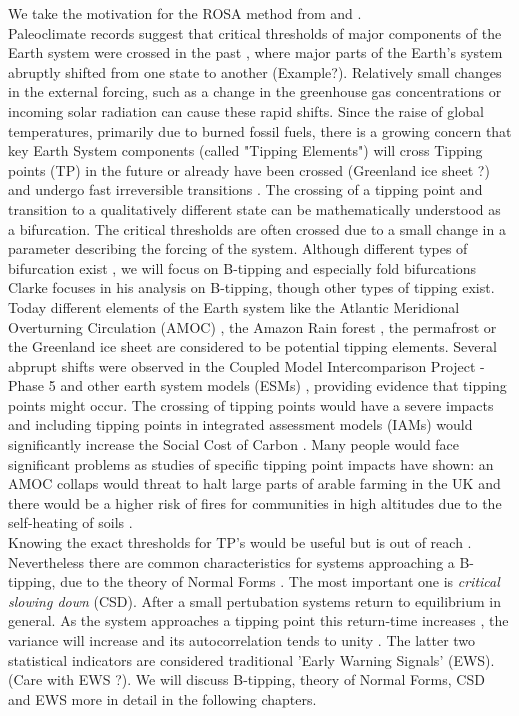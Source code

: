 \documentclass[%
thesis=student,%
coverpage=false,%
titlepage=false,%
headmarks=true, %
german,%
font=libertine, %
math=newpxtx, %
BCOR=5mm,%
coverBCOR=11mm%
]{tumbook}
\begin{document}
We take the motivation for the ROSA method from \cite{Clarke:2023} and \cite{Scheffer:2009}.\\
Paleoclimate records suggest that critical thresholds of major components of the Earth system were crossed in the past \cite{Brovkin:2021}, where major parts of the Earth's system abruptly shifted from one state to another (Example?). Relatively small changes in the external forcing, such as a change in the greenhouse gas concentrations or incoming solar radiation can cause these rapid shifts. Since the raise of global temperatures, primarily due to burned fossil fuels, there is a growing concern \cite{Lenton:2019,Steffen:2018,Ritchie:2021} that key Earth System components (called "Tipping Elements") will cross Tipping points (TP) in the future or already have been crossed (Greenland ice sheet ?) and undergo fast irreversible transitions \cite{Lenton:2008}. 
The crossing of a tipping point and transition to a qualitatively different state can be mathematically understood as a bifurcation. The critical thresholds are often crossed due to a small change in a parameter describing the forcing of the system. Although different types of bifurcation exist \cite{Ashwin:2012}, we will focus on B-tipping and especially fold bifurcations Clarke focuses in his analysis on B-tipping, though other types of tipping exist. Today different elements of the Earth system like the Atlantic Meridional Overturning Circulation (AMOC) \cite{Stommel:1961}, the Amazon Rain forest \cite{Cox:2000}, the permafrost \cite{Steffen:2018} or the Greenland ice sheet \cite{Feldmann:2015} are considered to be potential tipping elements. Several abprupt shifts were observed in the Coupled Model Intercomparison Project - Phase 5 \cite{Taylor:2012} and other earth system models (ESMs) \cite{Drijfhout:2015}, providing evidence that tipping points might occur. The crossing of tipping points would have a severe impacts and including tipping points in integrated assessment models (IAMs) would significantly increase the Social Cost of Carbon \cite{Dietz:2021}. Many people would face significant problems as studies of specific tipping point impacts have shown: an AMOC collaps would threat to halt large parts of arable farming in the UK \cite{Ritchie:2020} and there would be a higher risk of fires for communities in high altitudes due to the self-heating of soils \cite{Clarke:2021}.    \\
Knowing the exact thresholds for TP's would be useful but is out of reach \cite{Steffen:2018,Drijfhout:2015}. Nevertheless there are common characteristics for systems approaching a B-tipping, due to the theory of Normal Forms \cite{Strogatz:2015,Guckenheimer:1983}. The most important one is \emph{critical slowing down} (CSD). After a small pertubation systems return to equilibrium in general. As the system approaches a tipping point this return-time increases \cite{Scheffer:2012}, the variance will increase and its autocorrelation tends to unity \cite{Scheffer:2009,Held:2004}. The latter two statistical indicators are considered traditional 'Early Warning Signals' (EWS). (Care with EWS ?). We will discuss B-tipping, theory of Normal Forms, CSD and EWS more in detail in the following chapters. \\
\end{document}
